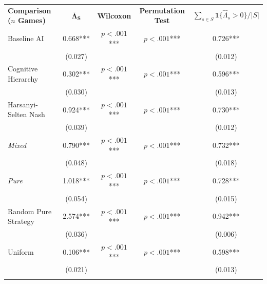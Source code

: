 \begin{tabular}{l c c c c}
    \hline \addlinespace[4pt]
    \textbf{Comparison ($n$ Games)} & \multicolumn{1}{c}{\textbf{$\mathbf{\bar{\Lambda}_S}$}} & \multicolumn{1}{c}{\textbf{Wilcoxon}} & \multicolumn{1}{c}{\textbf{Permutation Test}} & \multicolumn{1}{c}{\textbf{$\sum_{s \in S} \mathbf 1\{\hat \Lambda_s > 0\} / |S|$}} \\
\addlinespace[6pt]\hline\addlinespace[6pt]
Baseline AI & \phantom{(}\phantom{....}0.668*** & $p<.001$*** & $p<.001$*** & \phantom{(}\phantom{....}0.726*** \\
 &  (0.027) & & &  (0.012) \\
\addlinespace[2pt]
\addlinespace[6pt]
Cognitive Hierarchy & \phantom{(}\phantom{....}0.302*** & $p<.001$*** & $p<.001$*** & \phantom{(}\phantom{....}0.596*** \\
 &  (0.030) & & &  (0.013) \\
\addlinespace[2pt]
\addlinespace[6pt]
Harsanyi-Selten Nash & \phantom{(}\phantom{....}0.924*** & $p<.001$*** & $p<.001$*** & \phantom{(}\phantom{....}0.730*** \\
 &  (0.039) & & &  (0.012) \\
\addlinespace[2pt]
\quad\quad \textit{Mixed} & \phantom{(}\phantom{....}0.790*** & $p<.001$*** & $p<.001$*** & \phantom{(}\phantom{....}0.732*** \\
 &  (0.048) & & &  (0.018) \\
\addlinespace[2pt]
\quad\quad \textit{Pure} & \phantom{(}\phantom{....}1.018*** & $p<.001$*** & $p<.001$*** & \phantom{(}\phantom{....}0.728*** \\
 &  (0.054) & & &  (0.015) \\
\addlinespace[2pt]
\addlinespace[6pt]
Random Pure Strategy & \phantom{(}\phantom{....}2.574*** & $p<.001$*** & $p<.001$*** & \phantom{(}\phantom{....}0.942*** \\
 &  (0.036) & & &  (0.006) \\
\addlinespace[2pt]
\addlinespace[6pt]
Uniform & \phantom{(}\phantom{....}0.106*** & $p<.001$*** & $p<.001$*** & \phantom{(}\phantom{....}0.598*** \\
 &  (0.021) & & &  (0.013) \\
\addlinespace[2pt]
\hline
\end{tabular}

